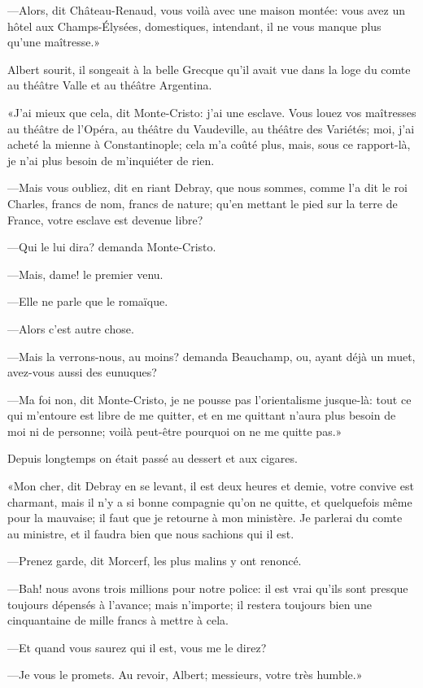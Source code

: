 —Alors, dit Château-Renaud, vous voilà avec une maison montée: vous avez un hôtel aux Champs-Élysées, domestiques, intendant, il ne vous manque plus qu'une maîtresse.» 

Albert sourit, il songeait à la belle Grecque qu'il avait vue dans la loge du comte au théâtre Valle et au théâtre Argentina. 

«J'ai mieux que cela, dit Monte-Cristo: j'ai une esclave. Vous louez vos maîtresses au théâtre de l'Opéra, au théâtre du Vaudeville, au théâtre des Variétés; moi, j'ai acheté la mienne à Constantinople; cela m'a coûté plus, mais, sous ce rapport-là, je n'ai plus besoin de m'inquiéter de rien. 

—Mais vous oubliez, dit en riant Debray, que nous sommes, comme l'a dit le roi Charles, francs de nom, francs de nature; qu'en mettant le pied sur la terre de France, votre esclave est devenue libre? 

—Qui le lui dira? demanda Monte-Cristo. 

—Mais, dame! le premier venu. 

—Elle ne parle que le romaïque. 

—Alors c'est autre chose. 

—Mais la verrons-nous, au moins? demanda Beauchamp, ou, ayant déjà un muet, avez-vous aussi des eunuques? 

—Ma foi non, dit Monte-Cristo, je ne pousse pas l'orientalisme jusque-là: tout ce qui m'entoure est libre de me quitter, et en me quittant n'aura plus besoin de moi ni de personne; voilà peut-être pourquoi on ne me quitte pas.» 

Depuis longtemps on était passé au dessert et aux cigares. 

«Mon cher, dit Debray en se levant, il est deux heures et demie, votre convive est charmant, mais il n'y a si bonne compagnie qu'on ne quitte, et quelquefois même pour la mauvaise; il faut que je retourne à mon ministère. Je parlerai du comte au ministre, et il faudra bien que nous sachions qui il est. 

—Prenez garde, dit Morcerf, les plus malins y ont renoncé. 

—Bah! nous avons trois millions pour notre police: il est vrai qu'ils sont presque toujours dépensés à l'avance; mais n'importe; il restera toujours bien une cinquantaine de mille francs à mettre à cela. 

—Et quand vous saurez qui il est, vous me le direz? 

—Je vous le promets. Au revoir, Albert; messieurs, votre très humble.» 

